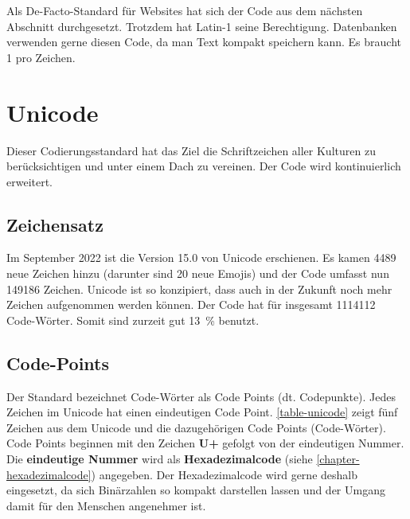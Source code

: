 Als De-Facto-Standard für Websites hat sich der Code aus dem nächsten Abschnitt durchgesetzt. Trotzdem hat Latin-1 seine Berechtigung. Datenbanken verwenden gerne diesen Code, da man Text kompakt speichern kann. Es braucht  \qty{1}{\byte} pro Zeichen.

\section{Unicode}

Dieser Codierungsstandard hat das Ziel die Schriftzeichen aller Kulturen zu berücksichtigen und unter einem Dach zu vereinen. Der Code wird kontinuierlich erweitert.

\subsection{Zeichensatz}

Im September 2022 ist die Version 15.0 von Unicode erschienen. Es kamen \num{4489} neue Zeichen hinzu (darunter sind \num{20} neue Emojis) und der Code umfasst nun \num{149186} Zeichen. Unicode ist so konzipiert, dass auch in der Zukunft noch mehr Zeichen aufgenommen werden können. Der Code hat  für insgesamt \num{1114112} Code-Wörter. Somit sind zurzeit gut \qty{13}{\percent} benutzt.

\subsection{Code-Points}

Der Standard bezeichnet Code-Wörter als Code Points (dt. Codepunkte). Jedes Zeichen im Unicode hat einen eindeutigen Code Point. \autoref{table-unicode} zeigt fünf Zeichen aus dem Unicode und die dazugehörigen Code Points (Code-Wörter). Code Points beginnen mit den Zeichen \textbf{U+} gefolgt von der eindeutigen Nummer. Die \textbf{eindeutige Nummer} wird als \textbf{Hexadezimalcode} (siehe \autoref{chapter-hexadezimalcode}) angegeben. Der Hexadezimalcode wird gerne deshalb eingesetzt, da sich Binärzahlen so kompakt darstellen lassen und der Umgang damit für den Menschen angenehmer ist.

